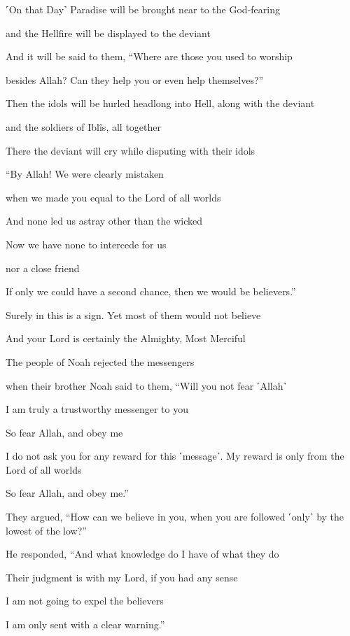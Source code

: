 ˹On that Day˺ Paradise will be brought near to the God-fearing

and the Hellfire will be displayed to the deviant

And it will be said to them, “Where are those you used to worship

besides Allah? Can they help you or even help themselves?”

Then the idols will be hurled headlong into Hell, along with the deviant

and the soldiers of Iblîs, all together

There the deviant will cry while disputing with their idols

“By Allah! We were clearly mistaken

when we made you equal to the Lord of all worlds

And none led us astray other than the wicked

Now we have none to intercede for us

nor a close friend

If only we could have a second chance, then we would be believers.”

Surely in this is a sign. Yet most of them would not believe

And your Lord is certainly the Almighty, Most Merciful

The people of Noah rejected the messengers

when their brother Noah said to them, “Will you not fear ˹Allah˺

I am truly a trustworthy messenger to you

So fear Allah, and obey me

I do not ask you for any reward for this ˹message˺. My reward is only from the Lord of all worlds

So fear Allah, and obey me.”

They argued, “How can we believe in you, when you are followed ˹only˺ by the lowest of the low?”

He responded, “And what knowledge do I have of what they do

Their judgment is with my Lord, if you had any sense

I am not going to expel the believers

I am only sent with a clear warning.”

